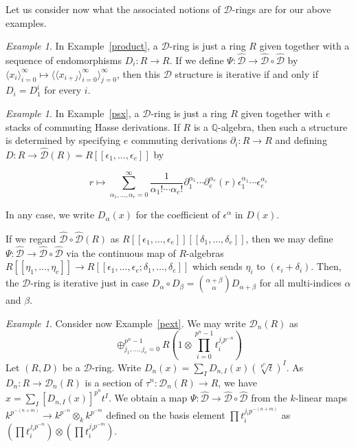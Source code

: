 \documentclass{amsart}
\newcommand{\QQ}{{\mathbb Q}}
\newcommand{\cD}{{\mathcal D}}
\theoremstyle{definition}
\theoremstyle{remark}
\newtheorem{Example}[thm]{Example}
\begin{document}
Let us consider now what the associated notions of $\cD$-rings are for 
our above examples.

\begin{Example}
In Example~\ref{product}, a $\cD$-ring is just a ring $R$ given together with 
a sequence of endomorphisms $D_i:R \to R$.   If we 
define $\Psi:\widehat{\cD} \to \widehat{\cD} \circ \widehat{\cD}$
by $\langle x_i \rangle_{i=0}^\infty \mapsto \langle \langle x_{i+j} \rangle_{i =0}^\infty \rangle_{j=0}^\infty$,
then this $\cD$ structure is iterative if and only if $D_i = D_1^i$ for every $i$.
\end{Example}

\begin{Example}
In Example~\ref{psx}, a $\cD$-ring is just a ring $R$ given together with 
$e$ stacks of commuting Hasse derivations.  If $R$ is a $\QQ$-algebra, then 
such a structure is determined by specifying $e$ commuting derivations
$\partial_i:R \to R$ and defining
$D:R \to \widehat{\cD}(R) = R[[\epsilon_1, \ldots, \epsilon_e]]$ by 

$$r \mapsto \sum_{\alpha_1, \ldots, \alpha_e = 0}^\infty \frac{1}{\alpha_1! \cdots \alpha_e!}
\partial_1^{\alpha_1} \cdots \partial_e^{\alpha_e} (r) \epsilon_1^{\alpha_1} \cdots \epsilon_e^{\alpha_e}$$

In any case, we write $D_\alpha(x)$ for the coefficient of $\epsilon^\alpha$ in
$D(x)$.

If we regard $\widehat{\cD} \circ \widehat{\cD} (R)$ as 
$R[[\epsilon_1, \ldots, \epsilon_e]][[\delta_1, \ldots, \delta_e]]$, 
then we may define $\Psi:\widehat{\cD} \to \widehat{\cD} \circ \widehat{\cD}$
via the continuous map of $R$-algebras $R[[\eta_1, \ldots, \eta_e]] 
\to R[[\epsilon_1, \ldots, \epsilon_e; \delta_1, \ldots, \delta_e]]$ 
which sends $\eta_i$ to $(\epsilon_i + \delta_i)$.   Then, the 
$\cD$-ring is iterative just in case 
$D_\alpha \circ D_\beta = \binom{\alpha + \beta}{\alpha} D_{\alpha + \beta}$ for
all multi-indices $\alpha$ and $\beta$.
\end{Example}

\begin{Example}
Consider now Example~\ref{pext}.  We may write $\cD_n(R)$ as 
$$\oplus_{j_1, \ldots, j_e = 0}^{p^n - 1} R (1 \otimes \prod_{i=0}^{p^n-1} t_i^{j_i p^{-n}})$$
Let $(R,D)$ be a $\cD$-ring.  Write $D_n(x) = \sum_{I} D_{n,I}(x) (\sqrt[p^n]{t})^I$.  
As $D_n:R \to \cD_n(R)$ is a section of $\tau^n:\cD_n(R) \to R$, we have 
$x = \sum_{I} [D_{n,I}(x)]^{p^n} t^I$.  We obtain a map 
$\Psi: \widehat{\cD} \to \widehat{\cD} \circ \widehat{\cD}$ from the $k$-linear 
maps $k^{p^{-(n+m)}} \to k^{p^{-n}} \otimes_k k^{p^{-m}}$ defined on the 
basis element $\prod t_i^{j_i p^{-(n+m)}}$ as 
$(\prod t_i^{j_i p^{-n}}) \otimes  (\prod t_i^{j_i p^{-m}})$.   
\end{Example}
\end{document}
